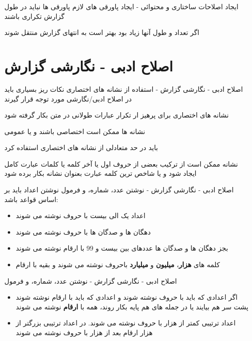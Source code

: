 \documentclass[14pt]{beamer}
\makeatletter
\newcommand{\rtlist}{\raggedleft\rightskip\@totalleftmargin}
\newcommand{\sectionfontsize}{\fontsize{22pt}{0pt}\selectfont}
\newcommand{\framefontsizelarge}{\fontsize{18pt}{0pt}\selectfont}
\newcommand{\frametitlefontsize}{\fontsize{20pt}{0pt}\selectfont}
\makeatother
\begin{document}
\begin{persian}
\begin{frame}[plain]{\frametitlefontsize ایجاد اصلاحات ساختاری و محتوائی - ایجاد پاورقی های لازم}
		پاورقی ها نباید در طول گزارش تکراری باشند
		
		اگر تعداد و طول آنها زیاد بود بهتر است به انتهای گزارش منتقل شوند
	\end{frame}	


	\section{\sectionfontsize اصلاح ادبی - نگارشی گزارش}

	\begin{frame}[plain]{\frametitlefontsize اصلاح ادبی - نگارشی گزارش - استفاده از نشانه های اختصاری}
		\framefontsizelarge
		نکات ریز بسیاری باید در اصلاح ادبی/نگارشی مورد توجه قرار گیرند
		
		نشانه های اختصاری برای پرهیز ار تکرار عبارات طولانی در متن بکار گرفته شود
		
		نشانه ها ممکن است اختصاصی باشند و یا عمومی
		
		باید در حد متعادلی از نشانه های اختصاری استفاده کرد
		
		نشانه ممکن است از ترکیب بعضی از حروف اول یا آخر کلمه یا کلمات عبارت کامل ایجاد شود و یا شاخص ترین کلمه عبارت بعنوان نشانه بکار برده شود
	\end{frame}	

	\begin{frame}[plain]{\frametitlefontsize اصلاح ادبی - نگارشی گزارش - نوشتن عدد، شماره، و فرمول}
		\framefontsizelarge
		نوشتن اعداد باید بر اساس قواعد باشد:
		\begin{itemize}\rtlist
			\item اعداد یک الی بیست با حروف نوشته می شوند
			\item دهگان ها و صدگان ها با حروف نوشته می شوند
			\item بجز دهگان ها و صدگان ها عددهای بین بیست و 99 با ارقام نوشته می شوند
			\item کلمه های \textbf{هزار}، \textbf{میلیون} و \textbf{میلیارد} باحروف نوشته می شوند و بقیه با ارقام
		\end{itemize}
	\end{frame}	
	
	\begin{frame}[plain]{\frametitlefontsize اصلاح ادبی - نگارشی گزارش - نوشتن عدد، شماره، و فرمول}
		\framefontsizelarge
		\begin{itemize}\rtlist
			\item اگر اعدادی که باید با حروف نوشته شوند و اعدادی که باید با ارقام نوشته شوند پشت سر هم بیایند یا در جمله های هم پایه بکار روند، همه با \textbf{ارقام} نوشته می شوند
			\item اعداد ترتیبی کمتر از هزار با حروف نوشته می شوند. در اعداد ترتیبی بزرگتر از هزار ارقام بعد از هزار با حروف نوشته می شوند
		\end{itemize}
	\end{frame}	
	

\end{persian}
\end{document}
